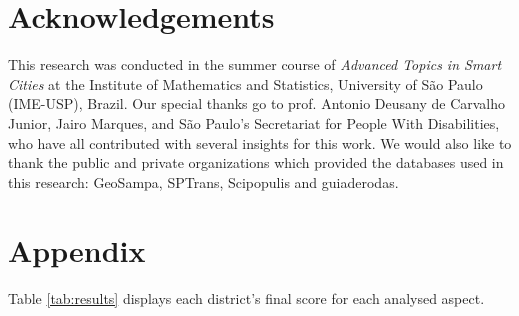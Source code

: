 \documentclass[12pt]{article}
\begin{document}

\section{Acknowledgements}
\label{sec:ack}

This research was conducted in the summer course of \textit{Advanced Topics in Smart Cities} at the Institute of Mathematics and Statistics, University of São Paulo (IME-USP), Brazil.
Our special thanks go to prof. Antonio Deusany de Carvalho Junior, Jairo Marques,
and São Paulo's Secretariat for People With Disabilities,
who have all contributed with several insights for this work.
We would also like to thank the public and private organizations which provided the databases used in this research: GeoSampa, SPTrans, Scipopulis and guiaderodas.




\newpage
\section*{Appendix}
\label{sec:appendix}

Table \ref{tab:results} displays each district's final score for each analysed aspect.
\end{document}
